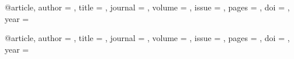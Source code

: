 
@article{,
	author = {},
	title = {{}},
	journal = {},
	volume = ,
	issue = {},
	pages = {},	
	doi = {},
	year = }

@article{,
	author = {},
	title = {{}},
	journal = {},
	volume = ,
	issue = {},
	pages = {},	
	doi = {},
	year = }



